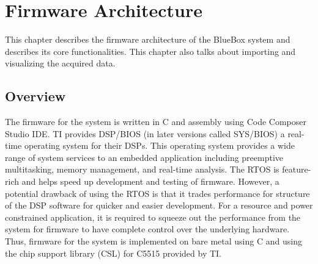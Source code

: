 \chapter{Firmware Architecture}\label{firmware_arch}

This chapter describes the firmware architecture of the BlueBox system
and describes its core functionalities. This chapter also talks about
importing and visualizing the acquired data.

\section{Overview}

The firmware for the system is written in C and assembly using Code
Composer Studio IDE. TI provides DSP/BIOS (in later versions called
SYS/BIOS) a real-time operating system for their DSPs. This operating
system provides a wide range of system services to an embedded
application including preemptive multitasking, memory management, and
real-time analysis. The RTOS is feature-rich and helps speed up
development and testing of firmware. However, a potential drawback of
using the RTOS is that it trades performance for structure of the DSP
software for quicker and easier development. For a resource and power
constrained application, it is required to squeeze out the
performance from the system for firmware to have complete control
over the underlying hardware. Thus, firmware for the system is
implemented on bare metal using C and using the chip support library
(CSL) for C5515 provided by TI. 


